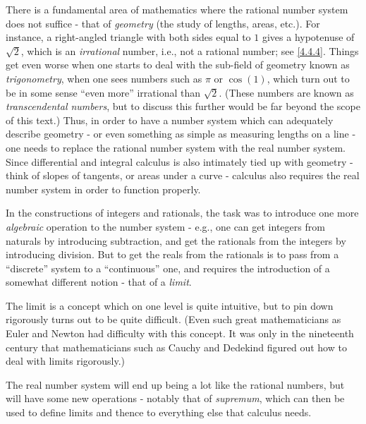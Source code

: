 \begin{note}
  There is a fundamental area of mathematics where the rational number system does not suffice - that of \emph{geometry}
  (the study of lengths, areas, etc.).
  For instance, a right-angled triangle with both sides equal to \(1\) gives a hypotenuse of \(\sqrt{2}\), which is an \emph{irrational} number, i.e., not a rational number;
  see \cref{4.4.4}.
  Things get even worse when one starts to deal with the sub-field of geometry known as \emph{trigonometry}, when one sees numbers such as \(\pi\) or \(\cos(1)\), which turn out to be in some sense ``even more'' irrational than \(\sqrt{2}\).
  (These numbers are known as \emph{transcendental numbers}, but to discuss this further would be far beyond the scope of this text.)
  Thus, in order to have a number system which can adequately describe geometry
  - or even something as simple as measuring lengths on a line
  - one needs to replace the rational number system with the real number system.
  Since differential and integral calculus is also intimately tied up with geometry
  - think of slopes of tangents, or areas under a curve
  - calculus also requires the real number system in order to function properly.
\end{note}

\begin{note}
  In the constructions of integers and rationals, the task was to introduce one more \emph{algebraic} operation to the number system
  - e.g., one can get integers from naturals by introducing subtraction, and get the rationals from the integers by introducing division.
  But to get the reals from the rationals is to pass from a ``discrete'' system to a ``continuous'' one, and requires the introduction of a somewhat different notion
  - that of a \emph{limit}.
\end{note}

\begin{note}
  The limit is a concept which on one level is quite intuitive, but to pin down rigorously turns out to be quite difficult.
  (Even such great mathematicians as Euler and Newton had difficulty with this concept.
  It was only in the nineteenth century that mathematicians such as Cauchy and Dedekind figured out how to deal with limits rigorously.)
\end{note}

\begin{note}
  The real number system will end up being a lot like the rational numbers, but will have some new operations
  - notably that of \emph{supremum}, which can then be used to define limits and thence to everything else that calculus needs.
\end{note}


